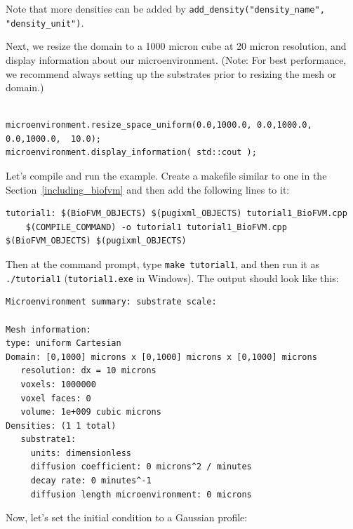 \documentclass[11pt]{article}
\begin{document}
\noindent Note that more densities can be added by \verb:add_density("density_name", "density_unit"):.


Next, we resize the domain to a 1000 micron cube at 20 micron resolution,
and display information about our microenvironment. (Note: For best
performance, we recommend always setting up the substrates prior to
resizing the mesh or domain.)


\begin{verbatim}

microenvironment.resize_space_uniform(0.0,1000.0, 0.0,1000.0, 0.0,1000.0,  10.0);
microenvironment.display_information( std::cout );
\end{verbatim}

Let's compile and run the example. Create a makefile similar to one in the Section~\ref{including_biofvm}
and then add the following lines to it:
\begin{verbatim}
tutorial1: $(BioFVM_OBJECTS) $(pugixml_OBJECTS) tutorial1_BioFVM.cpp
	$(COMPILE_COMMAND) -o tutorial1 tutorial1_BioFVM.cpp $(BioFVM_OBJECTS) $(pugixml_OBJECTS)
\end{verbatim}

Then at the command prompt, type \verb:make tutorial1:, and then run it as
\verb:./tutorial1: (\verb:tutorial1.exe: in Windows). The output should look
like this:

\begin{verbatim}
Microenvironment summary: substrate scale:

Mesh information:
type: uniform Cartesian
Domain: [0,1000] microns x [0,1000] microns x [0,1000] microns
   resolution: dx = 10 microns
   voxels: 1000000
   voxel faces: 0
   volume: 1e+009 cubic microns
Densities: (1 1 total)
   substrate1:
     units: dimensionless
     diffusion coefficient: 0 microns^2 / minutes
     decay rate: 0 minutes^-1
     diffusion length microenvironment: 0 microns
\end{verbatim}


\noindent Now, let's set the initial condition to a Gaussian profile:
\end{document}
